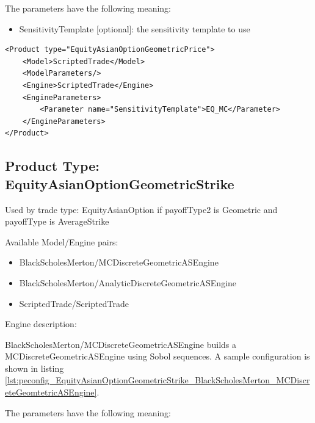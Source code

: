 The parameters have the following meaning:

\begin{itemize}
\item SensitivityTemplate [optional]: the sensitivity template to use
\end{itemize}

\begin{longlisting}
\begin{verbatim}
<Product type="EquityAsianOptionGeometricPrice">
    <Model>ScriptedTrade</Model>
    <ModelParameters/>
    <Engine>ScriptedTrade</Engine>
    <EngineParameters>
        <Parameter name="SensitivityTemplate">EQ_MC</Parameter>
    </EngineParameters>
</Product>
\end{verbatim}
\caption{Configuration for Product EquityAsianOptionGeometricPrice, Model ScriptedTrade, Engine ScriptedTrade}
\label{lst:peconfig_EquityAsianOptionGeometricPrice_ScriptedTrade_ScriptedTrade}
\end{longlisting}

\subsection{Product Type: EquityAsianOptionGeometricStrike}

Used by trade type: EquityAsianOption if payoffType2 is Geometric and payoffType is AverageStrike

Available Model/Engine pairs:

\begin{itemize}
  \item BlackScholesMerton/MCDiscreteGeometricASEngine
  \item BlackScholesMerton/AnalyticDiscreteGeometricASEngine
  \item ScriptedTrade/ScriptedTrade
\end{itemize}

Engine description:

BlackScholesMerton/MCDiscreteGeometricASEngine builds a MCDiscreteGeometricASEngine using Sobol sequences. A sample
configuration is shown in listing
\ref{lst:peconfig_EquityAsianOptionGeometricStrike_BlackScholesMerton_MCDiscreteGeomtetricASEngine}.

The parameters have the following meaning:


